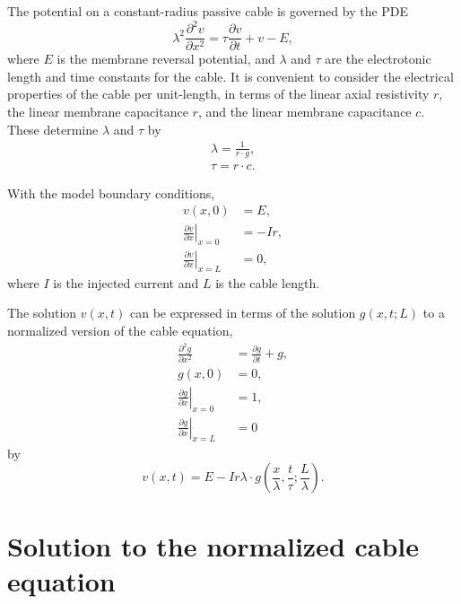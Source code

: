 \documentclass[parskip=half]{scrartcl}
\begin{document}
The potential on a constant-radius passive cable is governed by the PDE
\begin{equation}
    \lambda^2 \frac{\partial^2 v}{\partial x^2} =
    \tau\frac{\partial v}{\partial t} + v - E,
\end{equation}
where $E$ is the membrane reversal potential, and $\lambda$ and $\tau$ are the
electrotonic length and time constants for the cable. It is convenient
to consider the electrical properties of the cable per unit-length, in terms
of the linear axial resistivity $r$, the linear membrane capacitance $r$,
and the linear membrane capacitance $c$. These determine $\lambda$ and $\tau$ by
\begin{gather*}
    \lambda = \frac{1}{r\cdot g},\\
    \tau = r\cdot c.
\end{gather*}

With the model boundary conditions,
\begin{subequations}
    \begin{align}
	v(x, 0) &= E, \\
	\left.\frac{\partial v}{\partial x}\right\vert_{x=0} & = -Ir, \\
	 \left.\frac{\partial v}{\partial x}\right\vert_{x=L} & = 0,
    \end{align}
\end{subequations}
where $I$ is the injected current and $L$ is the cable length.

The solution $v(x, t)$ can be expressed in terms of the solution $g(x, t; L)$
to a normalized version of the cable equation,
\begin{subequations}
    \begin{align}
	\label{eq:normcable}
	\frac{\partial^2 g}{\partial x^2} & =
	\frac{\partial g}{\partial t} + g,
        \\
	\label{eq:normcableinitial}
	g(x, 0) &= 0,
	\\
	\label{eq:normcableleft}
	\left.\frac{\partial g}{\partial x}\right\vert_{x=0} & = 1,
	\\
	\label{eq:normcableright}
	\left.\frac{\partial g}{\partial x}\right\vert_{x=L} & = 0
    \end{align}
\end{subequations}
by
\begin{equation}
    v(x, t)= E - Ir\lambda \cdot g(\frac{x}{\lambda}, \frac{t}{\tau};  \frac{L}{\lambda}).
\end{equation}

\section{Solution to the normalized cable equation}
\end{document}
